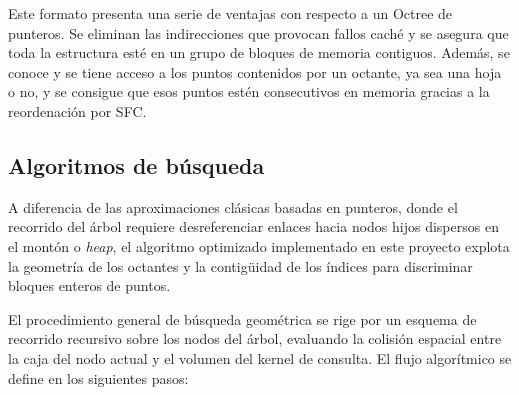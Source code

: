 Este formato presenta una serie de ventajas con respecto a un Octree de punteros. Se eliminan las indirecciones que provocan fallos caché y se asegura que toda la estructura esté en un grupo de bloques de memoria contiguos. Además, se conoce y se tiene acceso a los puntos contenidos por un octante, ya sea una hoja o no, y se consigue que esos puntos estén consecutivos en memoria gracias a la reordenación por SFC.

\subsection{Algoritmos de búsqueda}

A diferencia de las aproximaciones clásicas basadas en punteros, donde el recorrido del árbol requiere desreferenciar enlaces hacia nodos hijos dispersos en el montón o \textit{heap}, el algoritmo optimizado implementado en este proyecto explota la geometría de los octantes y la contigüidad de los índices para discriminar bloques enteros de puntos.

El procedimiento general de búsqueda geométrica se rige por un esquema de recorrido recursivo sobre los nodos del árbol, evaluando la colisión espacial entre la caja del nodo actual y el volumen del kernel de consulta. El flujo algorítmico se define en los siguientes pasos:


